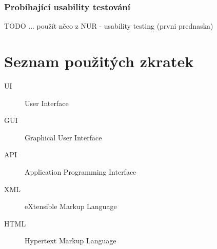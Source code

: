 \documentclass[thesis=M,czech]{FITthesis}[2012/06/26]
\begin{document}
\subsection{Probíhající usability testování} \label{subsec:testovani_akceptacni_utest}
TODO ... použít něco z NUR - usability testing (prvni prednaska)

\begin{conclusion}
\end{conclusion}

\nocite{*}



\appendix

\chapter{Seznam použitých zkratek}
\begin{description}
	\item[UI] User Interface
	\item[GUI] Graphical User Interface
	\item[API] Application Programming Interface
	\item[XML] eXtensible Markup Language
	\item[HTML] Hypertext Markup Language
\end{description}
\end{document}
